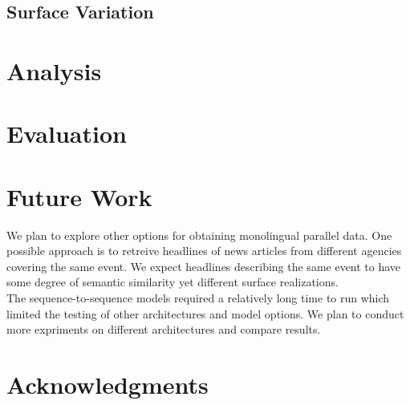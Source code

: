 \documentclass[11pt,letterpaper]{article}
\begin{document}
\subsection{Surface Variation}

\section{Analysis}

\section{Evaluation}

\section{Future Work}
We plan to explore other options for obtaining monolingual parallel data. One possible approach is to retreive headlines of news articles from different agencies covering the same event. We expect headlines describing the same event to have some degree of semantic similarity yet different surface realizations.\\
The sequence-to-sequence models required a relatively long time to run which limited the testing of other architectures and model options. We plan to conduct more expriments on different architectures and compare results.  





\section*{Acknowledgments}



\end{document}
